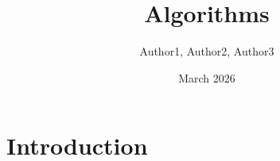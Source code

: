 \documentclass{article}
\title{Algorithms}
\author{Author1, Author2, Author3}
\date{March 2026}
\begin{document}
\maketitle

\section{Introduction}
\end{document}
